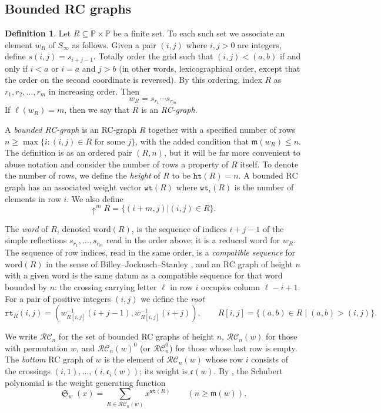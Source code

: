 \documentclass{amsart}
\theoremstyle{definition}
\newtheorem{definition}[lemma]{Definition}
\theoremstyle{remark}
\numberwithin{equation}{subsection}
\DeclareMathOperator{\sch}{\mathfrak{S}}
\newcommand{\shup}{{\uparrow}}
\newcommand{\wof}[1]{w_{#1}}
\newcommand{\wtt}{\mathtt{wt}}
\newcommand{\rtt}{\mathtt{rt}}
\newcommand{\hr}{\mathtt{ht}}
\newcommand{\RC}{\mathcal{RC}}
\newcommand{\code}{\mathfrak{c}}
\newcommand{\maxd}{\mathfrak{m}}
\begin{document}
\subsection{Bounded RC graphs}

\begin{definition}\label{definition:rcgraph}
	Let $R\subseteq \mathbb{P}\times \mathbb{P}$ be a finite set. To each such set we associate an element $\wof{R}$ of $S_\infty$ as follows. Given a pair $(i, j)$ where $i,j>0$ are integers, define $s(i,j) = s_{i+j - 1}$. Totally order the grid such that $(i, j) < (a, b)$ if and only if $i < a$ or $i = a$ and $j > b$ (in other words, lexicographical order, except that the order on the second coordinate is reversed). By this ordering, index $R$ as $r_1, r_2,\ldots, r_m$ in increasing order. Then
	$$\wof{R} = s_{r_1}\cdots s_{r_m}$$
	If $\ell(\wof{R}) = m$, then we say that $R$ is an \emph{RC-graph}.

	A \emph{bounded RC-graph} is an RC-graph $R$ together with a specified number of rows $n\geq \max\{i: (i,j)\in R\text{ for some }j\}$, with the added condition that $\maxd(\wof{R})\leq n$. The definition is as an ordered pair $(R, n)$, but it will be far more convenient to abuse notation and consider the number of rows a property of $R$ itself. To denote the number of rows, we define the \emph{height} of $R$ to be $\hr(R)=n$. A bounded RC graph has an associated weight vector $\wtt(R)$ where $\wtt_i(R)$ is the number of elements in row $i$. We also define
	$$\shup^m R=\{(i+m, j)| (i,j)\in R\}.$$

	The \emph{word} of $R$, denoted $\mathrm{word}(R)$, is the sequence of indices $i+j-1$ of the simple reflections $s_{r_1},\ldots,s_{r_m}$ read in the order above; it is a reduced word for $\wof{R}$. The sequence of row indices, read in the same order, is a \emph{compatible sequence} for $\mathrm{word}(R)$ in the sense of Billey--Jockusch--Stanley \cite{bjs}, and an RC graph of height $n$ with a given word is the same datum as a compatible sequence for that word bounded by $n$: the crossing carrying letter $\ell$ in row $i$ occupies column $\ell-i+1$. For a pair of positive integers $(i,j)$ we define the \emph{root}
	$$\rtt_R(i,j)=(\wof{R[i, j]}^{-1}(i + j - 1), \wof{R[i,j]}^{-1}(i+j)),\qquad R[i, j]=\{(a, b)\in R\mid (a, b) > (i, j)\}.$$
\end{definition}

We write $\RC_n$ for the set of bounded RC graphs of height $n$, $\RC_n(w)$ for those with permutation $w$, and $\RC_n(w)^0$ (or $\RC_n^0$) for those whose last row is empty. The \emph{bottom} RC graph of $w$ is the element of $\RC_n(w)$ whose row $i$ consists of the crossings $(i,1),\ldots,(i,\code_i(w))$; its weight is $\code(w)$. By \cite{bjs}, the Schubert polynomial is the weight generating function
$$\sch_w(x)=\sum_{R\in\RC_n(w)}x^{\wtt(R)}\qquad (n\geq\maxd(w)).$$
\end{document}
